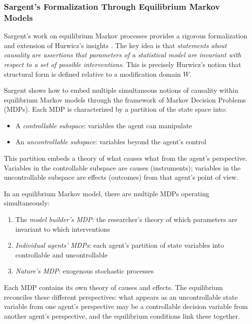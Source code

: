 \documentclass[12pt]{article}
\begin{document}
\subsubsection{Sargent's Formalization Through Equilibrium Markov Models}

Sargent's work on equilibrium Markov processes provides a rigorous formalization and extension of Hurwicz's insights \cite{SargentJPE2025}. The key idea is that \emph{statements about causality are assertions that parameters of a statistical model are invariant with respect to a set of possible interventions}. This is precisely Hurwicz's notion that structural form is defined relative to a modification domain $W$.

Sargent shows how to embed multiple simultaneous notions of causality within equilibrium Markov models through the framework of Markov Decision Problems (MDPs). Each MDP is characterized by a partition of the state space into:
\begin{itemize}
\item A \emph{controllable subspace}: variables the agent can manipulate
\item An \emph{uncontrollable subspace}: variables beyond the agent's control
\end{itemize}

This partition embeds a theory of what causes what from the agent's perspective. Variables in the controllable subspace are causes (instruments); variables in the uncontrollable subspace are effects (outcomes) from that agent's point of view.

In an equilibrium Markov model, there are multiple MDPs operating simultaneously:
\begin{enumerate}
\item The \emph{model builder's MDP}: the researcher's theory of which parameters are invariant to which interventions
\item \emph{Individual agents' MDPs}: each agent's partition of state variables into controllable and uncontrollable
\item \emph{Nature's MDP}: exogenous stochastic processes
\end{enumerate}

Each MDP contains its own theory of causes and effects. The equilibrium reconciles these different perspectives: what appears as an uncontrollable state variable from one agent's perspective may be a controllable decision variable from another agent's perspective, and the equilibrium conditions link these together.
\end{document}
